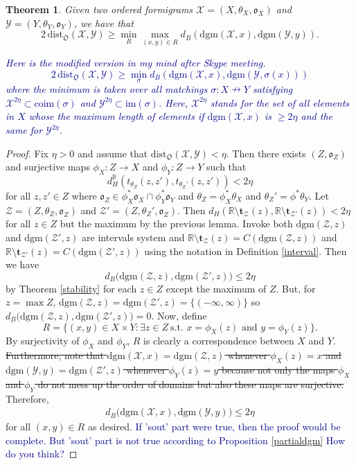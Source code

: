 \documentclass[a4paper,12pt]{article}
\newtheorem{theorem}{Theorem}[section]
\newcommand{\woojin}[1]           {{ \textcolor{darkblue} {#1}}}
\newcommand{\dgm}{\mathrm{dgm}}
\begin{document}
\begin{theorem}
Given two ordered formigrams $\mathcal{X} = (X,\theta_X, \mathfrak{o}_X)$ and $\mathcal{Y}=(Y,\theta_Y, \mathfrak{o}_Y)$, we have that 
$$2\,\mathrm{dist}_{\mathfrak{O}}(\mathcal{X},\mathcal{Y})\geq\min_{R}\max_{(x,y)\in R} d_B(\mathrm{dgm}(\mathcal{X},x),\mathrm{dgm}(\mathcal{Y},y)).$$

\woojin{Here is the modified version in my mind after Skype meeting.
$$2\, \mathrm{dist}_{\mathfrak{O}}(\mathcal{X},\mathcal{Y})\geq\min_{\sigma} d_B(\mathrm{dgm}(\mathcal{X},x),\mathrm{dgm}(\mathcal{Y},\sigma(x)))$$ where the minimum is taken over all matchings $\sigma:X\nrightarrow Y$ satisfying $\mathcal{X}^{2\eta}\subset \mathrm{coim}(\sigma)$ and $\mathcal{Y}^{2\eta}\subset \mathrm{im}(\sigma)$. Here, $\mathcal{X}^{2\eta}$ stands for the set of all elements in $X$ whose the maximum length of elements if $\dgm(\mathcal{X},x)$ is $\geq 2\eta$ and the same for $\mathcal{Y}^{2\eta}$.}

\end{theorem}
\begin{proof}
Fix $\eta>0$ and assume that $\mathrm{dist}_{\mathfrak{O}}(\mathcal{X},\mathcal{Y})< \eta.$ Then there exists $(Z,\mathfrak{o}_Z)$ and surjective maps $\phi_X:Z\rightarrow X$ and $\phi_Y: Z \rightarrow Y$ such that $$d_H^{\mathbb{R}}(t_{\theta_Z}(z,z'), t_{\theta_Z'}(z,z'))<2\eta$$ for all $z,z'\in Z$ where $\mathfrak{o}_Z\in \phi^*_X\mathfrak{o}_X\cap \phi^*_Y\mathfrak{o}_Y$ and $\theta_Z=\phi^*_X \theta_X$ and $\theta_Z'=\phi^*\theta_Y$. Let $\mathcal{Z}=(Z,\theta_Z, \mathfrak{o}_Z)$ and $\mathcal{Z}'=(Z,\theta_Z', \mathfrak{o}_Z)$. Then $d_H(\mathbb{R}\setminus \mathbf{t}_{\mathcal{Z}}(z),\mathbb{R}\setminus \mathbf{t}_{\mathcal{Z}'}(z))<2\eta$ for all $z\in Z$ but the maximum by the previous lemma. Invoke both $\dgm(\mathcal{Z},z)$ and $\dgm(\mathcal{Z}',z)$ are intervals system and $\mathbb{R}\setminus \mathbf{t}_{\mathcal{Z}}(z)=C(\dgm(\mathcal{Z}, z))$ and $\mathbb{R}\setminus \mathbf{t}_{\mathcal{Z}'}(z)=C(\dgm(\mathcal{Z}', z))$ using the notation in Definition \ref{interval}. Then we have $$d_B\big(\dgm(\mathcal{Z},z), \dgm(\mathcal{Z}',z)\big)\leq 2\eta$$ by Theorem \ref{stability} for each $z\in Z$ except the maximum of $Z$. But, for $z=\max Z$, $\dgm(\mathcal{Z},z)=\dgm(\mathcal{Z}',z)=\{(-\infty, \infty)\}$ so $d_B\big(\dgm(\mathcal{Z},z), \dgm(\mathcal{Z}',z)\big)=0$. Now, define $$R=\{(x,y)\in X\times Y:\exists z\in Z\ \mbox{s.t. $x=\phi_X(z)$ and $y=\phi_Y(z)$}\}.$$
By surjectivity of $\phi_X$ and $\phi_Y$, $R$ is clearly a correspondence between $X$ and $Y$. \sout{Furthermore, note that $\dgm(\mathcal{X},x)=\dgm(\mathcal{Z},z)$ whenever $\phi_X(z)=x$ and   $\dgm(\mathcal{Y},y)=\dgm(\mathcal{Z}',z)$ whenever $\phi_Y(z)=y$ because not only the maps $\phi_X$ and $\phi_Y$ do not mess up the order of domains but also these maps are surjective.} Therefore, 
\begin{align*}
d_B\big(\dgm(\mathcal{X},x),\dgm(\mathcal{Y},y)\big)\leq 2\eta
\end{align*} for all $(x,y)\in R$ as desired.
\woojin{If 'sout' part were true, then the proof would be complete. But 'sout' part is not true according to Proposition \ref{partialdgm} How do you think?}
\end{proof}
\end{document}
